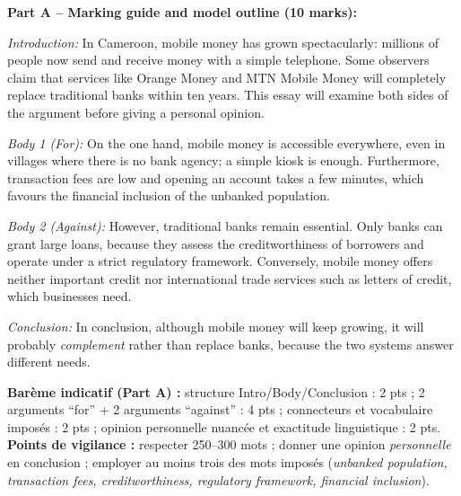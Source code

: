 \documentclass[11pt]{article}
\begin{document}
\begin{corrige}
\textbf{Part A -- Marking guide and model outline (10 marks):}

\emph{Introduction:} In Cameroon, mobile money has grown spectacularly: millions of people now send and receive money with a simple telephone. Some observers claim that services like Orange Money and MTN Mobile Money will completely replace traditional banks within ten years. This essay will examine both sides of the argument before giving a personal opinion.

\emph{Body 1 (For):} On the one hand, mobile money is accessible everywhere, even in villages where there is no bank agency; a simple kiosk is enough. Furthermore, transaction fees are low and opening an account takes a few minutes, which favours the financial inclusion of the unbanked population.

\emph{Body 2 (Against):} However, traditional banks remain essential. Only banks can grant large loans, because they assess the creditworthiness of borrowers and operate under a strict regulatory framework. Conversely, mobile money offers neither important credit nor international trade services such as letters of credit, which businesses need.

\emph{Conclusion:} In conclusion, although mobile money will keep growing, it will probably \emph{complement} rather than replace banks, because the two systems answer different needs.

\textbf{Barème indicatif (Part A) :} structure Intro/Body/Conclusion : 2 pts ; 2 arguments ``for'' + 2 arguments ``against'' : 4 pts ; connecteurs et vocabulaire imposés : 2 pts ; opinion personnelle nuancée et exactitude linguistique : 2 pts.
\textbf{Points de vigilance :} respecter 250--300 mots ; donner une opinion \emph{personnelle} en conclusion ; employer au moins trois des mots imposés (\emph{unbanked population, transaction fees, creditworthiness, regulatory framework, financial inclusion}).


\end{corrige}
\end{document}
